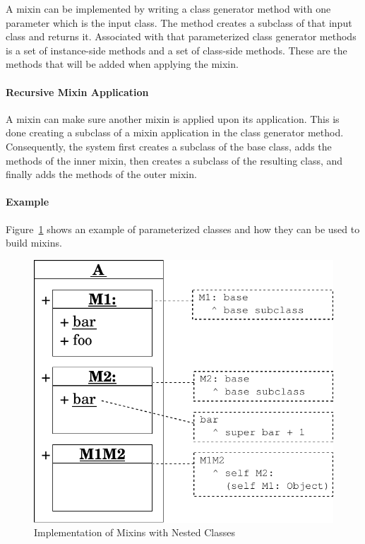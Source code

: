 A mixin can be implemented by writing a class generator method with one parameter which is the input class. The method creates a subclass of that input class and returns it. Associated with that parameterized class generator methods is a set of instance-side methods and a set of class-side methods. These are the methods that will be added when applying the mixin.

\paragraph{Recursive Mixin Application}
A mixin can make sure another mixin is applied upon its application. This is done creating a subclass of a mixin application in the class generator method. Consequently, the system first creates a subclass of the base class, adds the methods of the inner mixin, then creates a subclass of the resulting class, and finally adds the methods of the outer mixin.

\paragraph{Example}
Figure~\ref{fig:concept_mixins} shows an example of parameterized classes and how they can be used to build mixins.

\begin{figure}[!htp]
	\centering
	\includegraphics[scale=0.75]{nested_mixins.pdf}
	\caption{Implementation of Mixins with Nested Classes}
	\label{fig:concept_mixins}
\end{figure}

